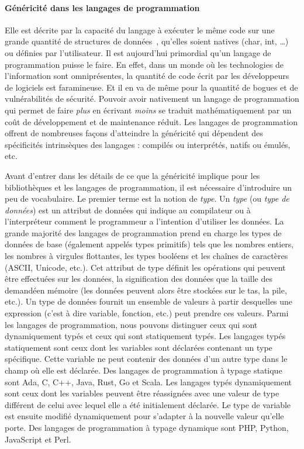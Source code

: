 \paragraph{Généricité dans les langages de programmation} Elle est décrite par la capacité du langage à exécuter le même
code sur une grande quantité de structures de données~\parencite{dehnert.1998.fundamentals}, qu'elles soient natives
(char, int, \ldots) ou définies par l'utilisateur. Il est aujourd'hui primordial qu'un langage de programmation puisse
le faire. En effet, dans un monde où les technologies de l'information sont omniprésentes, la quantité de code écrit par
les développeurs de logiciels est faramineuse. Et il en va de même pour la quantité de bogues et de vulnérabilités de
sécurité. Pouvoir avoir nativement un langage de programmation qui permet de faire \emph{plus} en écrivant \emph{moins}
se traduit mathématiquement par un coût de développement et de maintenance réduit. Les langages de programmation offrent
de nombreuses façons d'atteindre la généricité qui dépendent des spécificités intrinsèques des langages : compilés ou
interprétés, natifs ou émulés, etc.

Avant d'entrer dans les détails de ce que la généricité implique pour les bibliothèques et les langages de
programmation, il est nécessaire d'introduire un peu de vocabulaire. Le premier terme est la notion de \emph{type}. Un
\emph{type} (ou \emph{type de données}) est un attribut de données qui indique au compilateur ou à l'interpréteur
comment le programmeur a l'intention d'utiliser les données. La grande majorité des langages de programmation prend en
charge les types de données de base (également appelés types primitifs) tels que les nombres entiers, les nombres à
virgules flottantes, les types booléens et les chaînes de caractères (ASCII, Unicode, etc.). Cet attribut de type
définit les opérations qui peuvent être effectuées sur les données, la signification des données que la taille des
demandéen mémoire (les données peuvent alors être stockées sur le tas, la pile, etc.). Un type de données fournit un
ensemble de valeurs à partir desquelles une expression (c'est à dire variable, fonction, etc.) peut prendre ces valeurs.
Parmi les langages de programmation, nous pouvons distinguer ceux qui sont dynamiquement typés et ceux qui sont
statiquement typés. Les langages typés statiquement sont ceux dont les variables sont déclarées contenant un type
spécifique. Cette variable ne peut contenir des données d'un autre type dans le champ où elle est déclarée. Des langages
de programmation à typage statique sont Ada, C, C++, Java, Rust, Go et Scala. Les langages typés dynamiquement sont ceux
dont les variables peuvent être réassignées avec une valeur de type différent de celui avec lequel elle a été
initialement déclarée. Le type de variable est ensuite modifié dynamiquement pour s'adapter à la nouvelle valeur qu'elle
porte. Des langages de programmation à typage dynamique sont PHP, Python, JavaScript et Perl.

